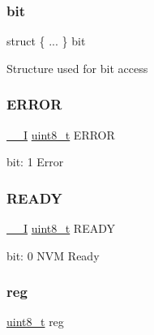 \subsubsection{\texorpdfstring{bit}{bit}}
{\footnotesize\ttfamily struct \{ ... \}   bit}

Structure used for bit access \mbox{\label{union_n_v_m_c_t_r_l___i_n_t_f_l_a_g___type_ab083f63120ce20369e2dbb0081da16e3}} 
\subsubsection{\texorpdfstring{ERROR}{ERROR}}
{\footnotesize\ttfamily \mbox{\hyperlink{core__cm0plus_8h_af63697ed9952cc71e1225efe205f6cd3}{\+\_\+\+\_\+I}} \mbox{\hyperlink{union_n_v_m_c_t_r_l___i_n_t_f_l_a_g___type_a5b4208c6f4c4a4290c4f2804d1eb1d5b}{uint8\+\_\+t}} E\+R\+R\+OR}

bit\+: 1 Error \mbox{\label{union_n_v_m_c_t_r_l___i_n_t_f_l_a_g___type_a7571a2b3407b72baa0f60aae0efa49c6}} 
\subsubsection{\texorpdfstring{READY}{READY}}
{\footnotesize\ttfamily \mbox{\hyperlink{core__cm0plus_8h_af63697ed9952cc71e1225efe205f6cd3}{\+\_\+\+\_\+I}} \mbox{\hyperlink{union_n_v_m_c_t_r_l___i_n_t_f_l_a_g___type_a5b4208c6f4c4a4290c4f2804d1eb1d5b}{uint8\+\_\+t}} R\+E\+A\+DY}

bit\+: 0 N\+VM Ready \mbox{\label{union_n_v_m_c_t_r_l___i_n_t_f_l_a_g___type_a9428adc9af4653a2050e2536b55dec8d}} 
\subsubsection{\texorpdfstring{reg}{reg}}
{\footnotesize\ttfamily \mbox{\hyperlink{union_n_v_m_c_t_r_l___i_n_t_f_l_a_g___type_a5b4208c6f4c4a4290c4f2804d1eb1d5b}{uint8\+\_\+t}} reg}

